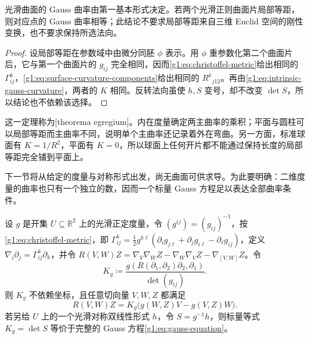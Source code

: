 \begin{theorem}
	\label{g1:thm:theorema-egregium}
	光滑曲面的 Gauss 曲率由第一基本形式决定。若两个光滑正则曲面片局部等距，则对应点的 Gauss 曲率相等；此结论不要求局部等距来自三维 Euclid 空间的刚性变换，也不要求保持所选法向。
\end{theorem}

\begin{proof}
	设局部等距在参数域中由微分同胚 \(\phi\) 表示。用 \(\phi\) 重参数化第二个曲面片后，它与第一个曲面片的 \(g_{ij}\) 完全相同，因而\eqref{g1:eq:christoffel-metric}给出相同的 \(\Gamma^k_{ij}\)，\eqref{g1:eq:surface-curvature-components}给出相同的 \(R^k{}_{j12}\)。再由\eqref{g1:eq:intrinsic-gauss-curvature}，两者的 \(K\) 相同。反转法向虽使 \(h,S\) 变号，却不改变 \(\det S\)，所以结论也不依赖该选择。
\end{proof}

这一定理称为[theorema egregium]。内在度量确定两主曲率的乘积；平面与圆柱可以局部等距而主曲率不同，说明单个主曲率还记录着外在弯曲。另一方面，标准球面有 \(K=1/R^2\)，平面有 \(K=0\)，所以球面上任何开片都不能通过保持长度的局部等距完全铺到平面上。

\ProseParagraphBreak

下一节将从给定的度量与对称形式出发，尚无曲面可供求导。为此要明确：二维度量的曲率也只有一个独立的数，因而一个标量 Gauss 方程足以表达全部曲率条件。

\begin{proposition}
	\label{g1:prop:surface-curvature-two-dim}
	设 \(g\) 是开集 \(U\subseteq\mathbb R^2\) 上的光滑正定度量，令 \((g^{ij})=(g_{ij})^{-1}\)，按\eqref{g1:eq:christoffel-metric}，即 \(\Gamma^k_{ij}=\tfrac12g^{k\ell}(\partial_i g_{j\ell}+\partial_jg_{i\ell}-\partial_\ell g_{ij})\)，定义 \(\nabla_i\partial_j=\Gamma^k_{ij}\partial_k\)，并令 \(R(V,W)Z=\nabla_V\nabla_WZ-\nabla_W\nabla_VZ-\nabla_{[V,W]}Z\)。令
	\[
		K_g\coloneqq\frac{g(R(\partial_1,\partial_2)\partial_2,\partial_1)}
		{\det(g_{ij})}.
	\]
	则 \(K_g\) 不依赖坐标，且任意切向量 \(V,W,Z\) 都满足
	\begin{equation}
		\label{g1:eq:two-dimensional-curvature}
		R(V,W)Z=K_g\bigl(g(W,Z)V-g(V,Z)W\bigr).
	\end{equation}
	若另给 \(U\) 上的一个光滑对称双线性形式 \(h\)，令 \(S=g^{-1}h\)，则标量等式 \(K_g=\det S\) 等价于完整的 Gauss 方程\eqref{g1:eq:gauss-equation}。
\end{proposition}

